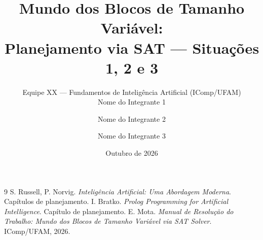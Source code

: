 \documentclass[11pt,a4paper]{article}
\title{Mundo dos Blocos de Tamanho Variável:\\
Planejamento via SAT --- Situações 1, 2 e 3}
\author{Equipe XX --- Fundamentos de Inteligência Artificial (IComp/UFAM)\\[4pt]
Nome do Integrante 1 \and Nome do Integrante 2 \and Nome do Integrante 3}
\date{Outubro de 2026}
\begin{document}
\maketitle


\tableofcontents
\newpage









% 

\begin{thebibliography}{9}
 S. Russell, P. Norvig. \emph{Inteligência Artificial: Uma Abordagem
  Moderna}. Capítulos de planejamento.
 I. Bratko. \emph{Prolog Programming for Artificial Intelligence}.
  Capítulo de planejamento.
 E. Mota. \emph{Manual de Resolução do Trabalho: Mundo dos Blocos de
  Tamanho Variável via SAT Solver}. IComp/UFAM, 2026.
\end{thebibliography}
\end{document}
